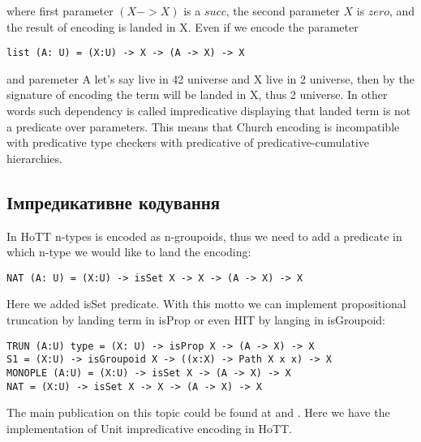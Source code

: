 where first parameter $(X -> X)$ is a $succ$, the second parameter $X$ is $zero$,
and the result of encoding is landed in X. Even if we encode the parameter

\begin{lstlisting}[mathescape=true]
list (A: U) = (X:U) -> X -> (A -> X) -> X
\end{lstlisting}

and paremeter A let's say live in 42 universe and X live in 2 universe, then by
the signature of encoding the term will be landed in X, thus 2 universe. In other words
such dependency is called impredicative displaying that landed term is not a predicate over parameters.
This means that Church encoding is incompatible with predicative type checkers with predicative
of predicative-cumulative hierarchies.

\subsection{Імпредикативне кодування}

In HoTT n-types is encoded as n-groupoids, thus we need to add a predicate in which n-type
we would like to land the encoding:

\begin{lstlisting}[mathescape=true]
NAT (A: U) = (X:U) -> isSet X -> X -> (A -> X) -> X
\end{lstlisting}

Here we added isSet predicate. With this motto we can implement propositional
truncation by landing term in isProp or even HIT by langing in isGroupoid:

\begin{lstlisting}[mathescape=true]
TRUN (A:U) type = (X: U) -> isProp X -> (A -> X) -> X
S1 = (X:U) -> isGroupoid X -> ((x:X) -> Path X x x) -> X
MONOPLE (A:U) = (X:U) -> isSet X -> (A -> X) -> X
NAT = (X:U) -> isSet X -> X -> (A -> X) -> X
\end{lstlisting}

The main publication on this topic could be found at \cite{Awodey17} and \cite{Speight17}.
Here we have the implementation of Unit impredicative encoding in HoTT.

